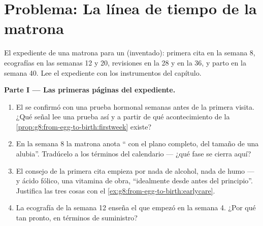 \section{Problema: La línea de tiempo de la matrona}

\begin{problem}\label{pb:g8:from-egg-to-birth:1}
El expediente de una matrona para un  (inventado): primera cita
en la semana 8, ecografías en las semanas 12 y 20, revisiones en la 28
y en la 36, y parto en la semana 40. Lee el expediente con los
instrumentos del capítulo.

\medskip\noindent\textbf{Parte I --- Las primeras páginas del expediente.}
\begin{enumerate}
  \item El  se confirmó con una prueba hormonal semanas antes
        de la primera visita. ¿Qué señal lee una prueba así y a partir
        de qué acontecimiento de la
        \cref{prop:g8:from-egg-to-birth:firstweek} existe?
  \item En la semana 8 la matrona anota `` con el plano
        completo, del tamaño de una alubia''. Tradúcelo a los términos
        del calendario --- ¿qué fase se cierra aquí?
  \item El consejo de la primera cita empieza por nada de alcohol, nada
        de humo --- y ácido fólico, una vitamina de obra, ``idealmente
        desde antes del principio''. Justifica las tres cosas con el
        \cref{ex:g8:from-egg-to-birth:earlycare}.
  \item La ecografía de la semana 12 enseña el  que empezó en la
        semana 4. ¿Por qué tan pronto, en términos de suministro?
\end{enumerate}


\end{problem}
